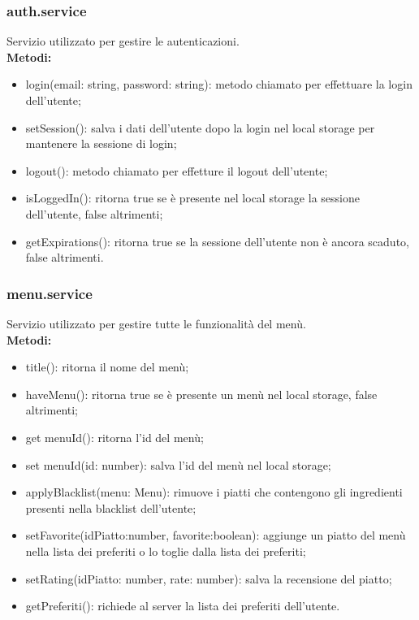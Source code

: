 \subsubsection{auth.service}
Servizio utilizzato per gestire le autenticazioni.\\
\textbf{Metodi:}
\begin{itemize}
    \item login(email: string, password: string): metodo chiamato per effettuare la login dell'utente;
    \item setSession(): salva i dati dell'utente dopo la login nel local storage per mantenere la sessione di login;
    \item logout(): metodo chiamato per effetture il logout dell'utente;
    \item isLoggedIn(): ritorna true se è presente nel local storage la sessione dell'utente, false altrimenti;
    \item getExpirations(): ritorna true se la sessione dell'utente non è ancora scaduto, false altrimenti.
\end{itemize}

\subsubsection{menu.service}
Servizio utilizzato per gestire tutte le funzionalità del menù.\\
\textbf{Metodi:}
\begin{itemize}
    \item title(): ritorna il nome del menù;
    \item haveMenu(): ritorna true se è presente un menù nel local storage, false altrimenti;
    \item get menuId(): ritorna l'id del menù;
    \item set menuId(id: number): salva l'id del menù nel local storage;
    \item applyBlacklist(menu: Menu): rimuove i piatti che contengono gli ingredienti presenti nella blacklist dell'utente;
    \item setFavorite(idPiatto:number, favorite:boolean): aggiunge un piatto del menù nella lista dei preferiti o lo toglie dalla lista dei preferiti;
    \item  setRating(idPiatto: number, rate: number): salva la recensione del piatto;
    \item getPreferiti(): richiede al server la lista dei preferiti dell'utente.
\end{itemize}

